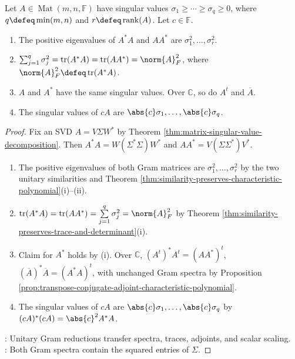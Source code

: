 \begin{proposition} \label{prop:basic-singular-value-identities} \\
Let $A\in\operatorname{Mat}(m,n,\mathbb{F})$ have singular values $\sigma_1\geq\cdots\geq\sigma_q\geq0$, where $q\defeq\min(m,n)$ and $r\defeq\operatorname{rank}(A)$. Let $c\in\mathbb{F}$.
\begin{enumerate}[label=(\roman*)]
\setlength{\itemsep}{0pt}
\item The positive eigenvalues of $A^*A$ and $AA^*$ are $\sigma_1^2,\ldots,\sigma_r^2$.
\item $\sum_{j=1}^{q}\sigma_j^2=\operatorname{tr}(A^*A)=\operatorname{tr}(AA^*)=\norm{A}_F^2$, where $\norm{A}_F^2\defeq\operatorname{tr}(A^*A)$.
\item $A$ and $A^*$ have the same singular values. Over $\mathbb{C}$, so do $A^t$ and $\overline{A}$.
\item The singular values of $cA$ are $\abs{c}\sigma_1,\ldots,\abs{c}\sigma_q$.
\end{enumerate}
\begin{proof}
Fix an SVD $A=V\Sigma W^*$ by Theorem \ref{thm:matrix-singular-value-decomposition}. Then $A^*A=W(\Sigma^*\Sigma)W^*$ and $AA^*=V(\Sigma\Sigma^*)V^*$.
\begin{enumerate}[label=(\roman*)]
\setlength{\itemsep}{0pt}
\item The positive eigenvalues of both Gram matrices are $\sigma_1^2,\ldots,\sigma_r^2$ by the two unitary similarities and Theorem \ref{thm:similarity-preserves-characteristic-polynomial}(i)--(ii).
\item $\operatorname{tr}(A^*A)=\operatorname{tr}(AA^*)=\sum\limits_{j=1}^{q}\sigma_j^2=\norm{A}_F^2$ by Theorem \ref{thm:similarity-preserves-trace-and-determinant}(i).
\item Claim for $A^*$ holds by (i). Over $\mathbb{C}$, $(A^t)^*A^t=(AA^*)^t$, $(\overline{A})^*\overline{A}=(A^*A)^t$, with unchanged Gram spectra by Proposition \ref{prop:transpose-conjugate-adjoint-characteristic-polynomial}.
\item The singular values of $cA$ are $\abs{c}\sigma_1,\ldots,\abs{c}\sigma_q$ by $(cA)^*(cA)=\abs{c}^2A^*A$.
\end{enumerate}
: Unitary Gram reductions transfer spectra, traces, adjoints, and scalar scaling.\\
: Both Gram spectra contain the squared entries of $\Sigma$.
\end{proof}
\end{proposition}

